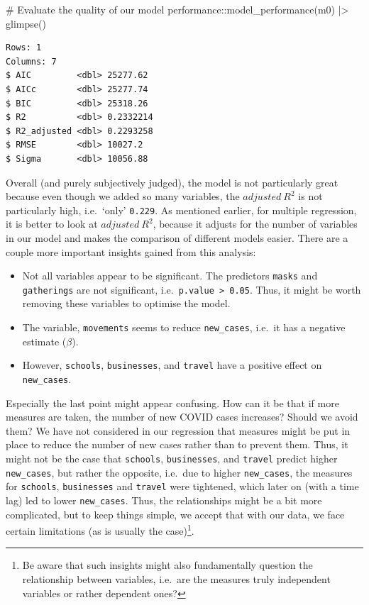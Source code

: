\documentclass[
  letterpaper,
]{krantz}
\makeatletter
\newenvironment{Shaded}{\begin{snugshade}}{\end{snugshade}}
\newcommand{\CommentTok}[1]{\textcolor[rgb]{0.37,0.37,0.37}{#1}}
\newcommand{\FunctionTok}[1]{\textcolor[rgb]{0.28,0.35,0.67}{#1}}
\newcommand{\NormalTok}[1]{\textcolor[rgb]{0.00,0.23,0.31}{#1}}
\newcommand{\SpecialCharTok}[1]{\textcolor[rgb]{0.37,0.37,0.37}{#1}}
\newenvironment{kframe}{%
\medskip{}
\setlength{\fboxsep}{.8em}
 \def\at@end@of@kframe{}%
 \ifinner\ifhmode%
  \def\at@end@of@kframe{\end{minipage}}%
  \begin{minipage}{\columnwidth}%
 \fi\fi%
 \def\FrameCommand##1{\hskip\@totalleftmargin \hskip-\fboxsep
 \colorbox{shadecolor}{##1}\hskip-\fboxsep
     \hskip-\linewidth \hskip-\@totalleftmargin \hskip\columnwidth}%
 \MakeFramed {\advance\hsize-\width
   \@totalleftmargin\z@ \linewidth\hsize
   \@setminipage}}%
 {\par\unskip\endMakeFramed%
 \at@end@of@kframe}
\renewenvironment{Shaded}{\begin{kframe}}{\end{kframe}}
\makeatother
\begin{document}
\begin{Shaded}
\begin{Highlighting}[]
\CommentTok{\# Evaluate the quality of our model}
\NormalTok{performance}\SpecialCharTok{::}\FunctionTok{model\_performance}\NormalTok{(m0) }\SpecialCharTok{|\textgreater{}}
  \FunctionTok{glimpse}\NormalTok{()}
\end{Highlighting}
\end{Shaded}

\begin{verbatim}
Rows: 1
Columns: 7
$ AIC         <dbl> 25277.62
$ AICc        <dbl> 25277.74
$ BIC         <dbl> 25318.26
$ R2          <dbl> 0.2332214
$ R2_adjusted <dbl> 0.2293258
$ RMSE        <dbl> 10027.2
$ Sigma       <dbl> 10056.88
\end{verbatim}

Overall (and purely subjectively judged), the model is not particularly
great because even though we added so many variables, the
\(adjusted \ R^2\) is not particularly high, i.e.~`only' \texttt{0.229}.
As mentioned earlier, for multiple regression, it is better to look at
\(adjusted \ R^2\), because it adjusts for the number of variables in
our model and makes the comparison of different models easier. There are
a couple more important insights gained from this analysis:

\begin{itemize}
\item
  Not all variables appear to be significant. The predictors
  \texttt{masks} and \texttt{gatherings} are not significant,
  i.e.~\texttt{p.value\ \textgreater{}\ 0.05}. Thus, it might be worth
  removing these variables to optimise the model.
\item
  The variable, \texttt{movements} seems to reduce \texttt{new\_cases},
  i.e.~it has a negative estimate (\(\beta\)).
\item
  However, \texttt{schools}, \texttt{businesses}, and \texttt{travel}
  have a positive effect on \texttt{new\_cases}.
\end{itemize}

Especially the last point might appear confusing. How can it be that if
more measures are taken, the number of new COVID cases increases? Should
we avoid them? We have not considered in our regression that measures
might be put in place to reduce the number of new cases rather than to
prevent them. Thus, it might not be the case that \texttt{schools},
\texttt{businesses}, and \texttt{travel} predict higher
\texttt{new\_cases}, but rather the opposite, i.e.~due to higher
\texttt{new\_cases}, the measures for \texttt{schools},
\texttt{businesses} and \texttt{travel} were tightened, which later on
(with a time lag) led to lower \texttt{new\_cases}. Thus, the
relationships might be a bit more complicated, but to keep things
simple, we accept that with our data, we face certain limitations (as is
usually the case)\footnote{Be aware that such insights might also
  fundamentally question the relationship between variables, i.e.~are
  the measures truly independent variables or rather dependent ones?}.
\end{document}
